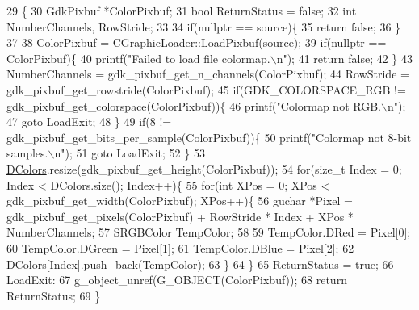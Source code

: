\begin{DoxyCode}
29                                                                 \{
30     GdkPixbuf *ColorPixbuf;
31     \textcolor{keywordtype}{bool} ReturnStatus = \textcolor{keyword}{false};
32     \textcolor{keywordtype}{int} NumberChannels, RowStride;
33     
34     \textcolor{keywordflow}{if}(\textcolor{keyword}{nullptr} == source)\{
35         \textcolor{keywordflow}{return} \textcolor{keyword}{false};   
36     \}
37 
38     ColorPixbuf = \hyperlink{classCGraphicLoader_ac7778dec4fd0ea51674f0b23f3029edf}{CGraphicLoader::LoadPixbuf}(source);
39     \textcolor{keywordflow}{if}(\textcolor{keyword}{nullptr} == ColorPixbuf)\{
40         printf(\textcolor{stringliteral}{"Failed to load file colormap.\(\backslash\)n"});
41         \textcolor{keywordflow}{return} \textcolor{keyword}{false};
42     \}
43     NumberChannels = gdk\_pixbuf\_get\_n\_channels(ColorPixbuf);
44     RowStride = gdk\_pixbuf\_get\_rowstride(ColorPixbuf);
45     \textcolor{keywordflow}{if}(GDK\_COLORSPACE\_RGB != gdk\_pixbuf\_get\_colorspace(ColorPixbuf))\{
46         printf(\textcolor{stringliteral}{"Colormap not RGB.\(\backslash\)n"});
47         \textcolor{keywordflow}{goto} LoadExit;
48     \}
49     \textcolor{keywordflow}{if}(8 != gdk\_pixbuf\_get\_bits\_per\_sample(ColorPixbuf))\{
50         printf(\textcolor{stringliteral}{"Colormap not 8-bit samples.\(\backslash\)n"});
51         \textcolor{keywordflow}{goto} LoadExit;
52     \}
53     \hyperlink{classCGraphicRecolorMap_a9dea9a9e96e4465a53a40c4a34cebf71}{DColors}.resize(gdk\_pixbuf\_get\_height(ColorPixbuf));
54     \textcolor{keywordflow}{for}(\textcolor{keywordtype}{size\_t} Index = 0; Index < \hyperlink{classCGraphicRecolorMap_a9dea9a9e96e4465a53a40c4a34cebf71}{DColors}.size(); Index++)\{
55         \textcolor{keywordflow}{for}(\textcolor{keywordtype}{int} XPos = 0; XPos < gdk\_pixbuf\_get\_width(ColorPixbuf); XPos++)\{
56             guchar *Pixel = gdk\_pixbuf\_get\_pixels(ColorPixbuf) + RowStride * Index + XPos * NumberChannels;
57             SRGBColor TempColor;
58             
59             TempColor.DRed = Pixel[0];
60             TempColor.DGreen = Pixel[1];
61             TempColor.DBlue = Pixel[2];
62             \hyperlink{classCGraphicRecolorMap_a9dea9a9e96e4465a53a40c4a34cebf71}{DColors}[Index].push\_back(TempColor);
63         \}   
64     \}
65     ReturnStatus = \textcolor{keyword}{true};
66 LoadExit:
67     g\_object\_unref(G\_OBJECT(ColorPixbuf));
68     \textcolor{keywordflow}{return} ReturnStatus;
69 \}
\end{DoxyCode}
